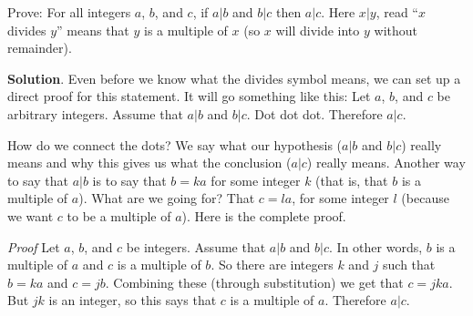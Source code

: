 \documentclass[11pt,]{book}
\makeatletter
\theoremstyle{ptxplainnotitle}
\theoremstyle{ptxplaintitle}
\renewcommand*{\proofname}{Proof}
\renewenvironment{proof}[1][\proofname]{\par
  \pushQED{\qed}%
  \normalfont \topsep6\p@\@plus6\p@\relax
  \trivlist
  \item\relax
    {\itshape
    #1\@addpunct{.}}\hspace\labelsep\ignorespaces
}{%
  \popQED\endtrivlist\@endpefalse
}
\theoremstyle{ptxdefinitionnotitle}
\theoremstyle{ptxdefinitiontitle}
\theoremstyle{ptxdefinitionnotitle}
\theoremstyle{ptxdefinitiontitle}
\theoremstyle{ptxdefinitionnotitle}
\theoremstyle{ptxdefinitiontitle}
\theoremstyle{ptxdefinitiontitlenonumber}
\theoremstyle{ptxdefinitiontitlenonumber}
\numberwithin{equation}{chapter}
\makeatother
\begin{document}
\begin{example}\label{example-64}
\hypertarget{p-2397}{}%
Prove: For all integers \(a\), \(b\), and \(c\), if \(a|b\) and \(b|c\) then \(a|c\). Here \(x|y\), read ``\(x\) divides \(y\)'' means that \(y\) is a multiple of \(x\) (so \(x\) will divide into \(y\) without remainder).%
\par\smallskip%
\noindent\textbf{Solution}.\hypertarget{solution-247}{}\quad%
\hypertarget{p-2398}{}%
Even before we know what the divides symbol means, we can set up a direct proof for this statement. It will go something like this: Let \(a\), \(b\), and \(c\) be arbitrary integers. Assume that \(a|b\) and \(b|c\). Dot dot dot. Therefore \(a|c\).%
\par
\hypertarget{p-2399}{}%
How do we connect the dots? We say what our hypothesis (\(a|b\) and \(b|c\)) really means and why this gives us what the conclusion (\(a|c\)) really means. Another way to say that \(a|b\) is to say that \(b = ka\) for some integer \(k\) (that is, that \(b\) is a multiple of \(a\)). What are we going for? That \(c = la\), for some integer \(l\) (because we want \(c\) to be a multiple of \(a\)). Here is the complete proof.%
\begin{proof}\hypertarget{proof-23}{}
\hypertarget{p-2400}{}%
Let \(a\), \(b\), and \(c\) be integers. Assume that \(a|b\) and \(b|c\). In other words, \(b\) is a multiple of \(a\) and \(c\) is a multiple of \(b\). So there are integers \(k\) and \(j\) such that \(b = ka\) and \(c = jb\). Combining these (through substitution) we get that \(c = jka\). But \(jk\) is an integer, so this says that \(c\) is a multiple of \(a\). Therefore \(a|c\).%
\end{proof}
\end{example}
\typeout{************************************************}
\typeout{************************************************}
\end{document}
